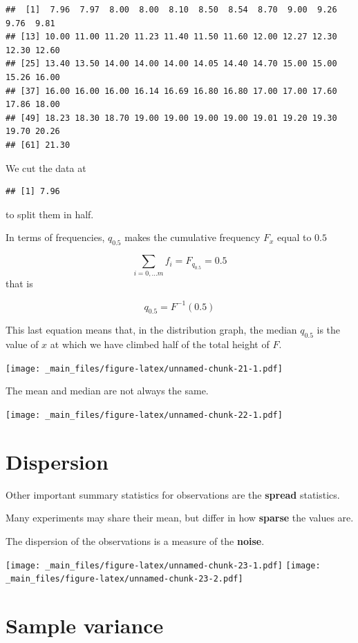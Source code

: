 \documentclass[
]{book}
\begin{document}
\begin{verbatim}
##  [1]  7.96  7.97  8.00  8.00  8.10  8.50  8.54  8.70  9.00  9.26  9.76  9.81
## [13] 10.00 11.00 11.20 11.23 11.40 11.50 11.60 12.00 12.27 12.30 12.30 12.60
## [25] 13.40 13.50 14.00 14.00 14.00 14.05 14.40 14.70 15.00 15.00 15.26 16.00
## [37] 16.00 16.00 16.00 16.14 16.69 16.80 16.80 17.00 17.00 17.60 17.86 18.00
## [49] 18.23 18.30 18.70 19.00 19.00 19.00 19.00 19.01 19.20 19.30 19.70 20.26
## [61] 21.30
\end{verbatim}

We cut the data at

\begin{verbatim}
## [1] 7.96
\end{verbatim}

to split them in half.

In terms of frequencies, \(q_{0.5}\) makes the cumulative frequency \(F_x\) equal to \(0.5\)

\[\sum_{i = 0, ... m} f_i =F_{q_{0.5}}=0.5\]
that is

\[q_{ 0.5}= F^{-1}(0.5)\]

This last equation means that, in the distribution graph, the median \(q_{ 0.5}\) is the value of \(x\) at which we have climbed half of the total height of \(F\).

\texttt{[image: \_main\_files/figure-latex/unnamed-chunk-21-1.pdf]}

The mean and median are not always the same.

\texttt{[image: \_main\_files/figure-latex/unnamed-chunk-22-1.pdf]}

\hypertarget{dispersion}{%
\section{Dispersion}\label{dispersion}}

Other important summary statistics for observations are the \textbf{spread} statistics.

Many experiments may share their mean, but differ in how \textbf{sparse} the values are.

The dispersion of the observations is a measure of the \textbf{noise}.

\texttt{[image: \_main\_files/figure-latex/unnamed-chunk-23-1.pdf]} \texttt{[image: \_main\_files/figure-latex/unnamed-chunk-23-2.pdf]}

\hypertarget{sample-variance}{%
\section{Sample variance}\label{sample-variance}}
\end{document}

